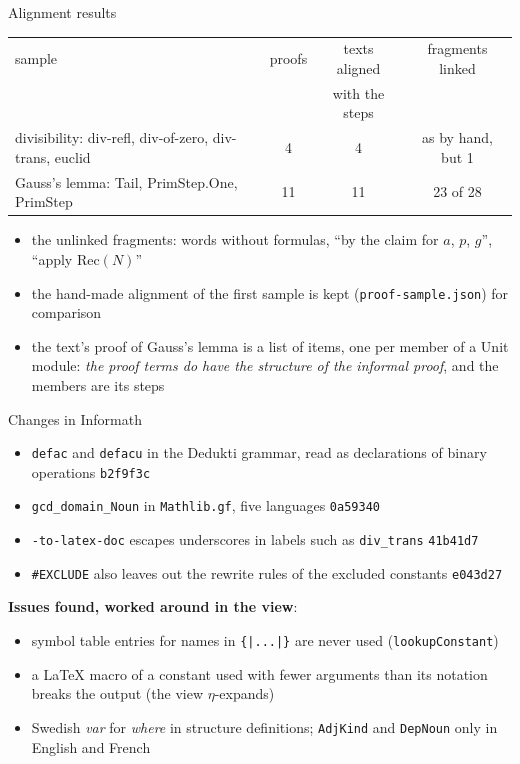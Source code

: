 \documentclass[10pt,aspectratio=169]{beamer}
\newcommand{\commit}[1]{\texttt{\footnotesize #1}}
\newcommand{\file}[1]{\texttt{#1}}
\begin{document}
\begin{frame}{Alignment results}

\centering
\small
\begin{tabular}{p{}ccc}
\toprule
sample & proofs & texts aligned & fragments linked \\
& & with the steps & \\
\midrule
divisibility: div-refl, div-of-zero, div-trans, euclid & 4 & 4 & as by hand, but 1 \\
Gauss's lemma: Tail, PrimStep.One, PrimStep & 11 & 11 & 23 of 28 \\
\bottomrule
\end{tabular}

\vspace{5mm}
\begin{itemize}\small
\item the unlinked fragments: words without formulas, ``by the claim
  for $a$, $p$, $g$'', ``apply $\mathrm{Rec}(N)$''
\item the hand-made alignment of the first sample is kept
  (\file{proof-sample.json}) for comparison
\item the text's proof of Gauss's lemma is a list of items, one per
  member of a Unit module: \emph{the proof terms do have the structure of
  the informal proof}, and the members are its steps
\end{itemize}

\end{frame}

\begin{frame}{Changes in Informath}

\small
\begin{itemize}
\item \texttt{defac} and \texttt{defacu} in the Dedukti grammar, read as
  declarations of binary operations \hfill\commit{b2f9f3c}
\item \texttt{gcd\_domain\_Noun} in \file{Mathlib.gf}, five languages
  \hfill\commit{0a59340}
\item \texttt{-to-latex-doc} escapes underscores in labels such as
  \texttt{div\_trans} \hfill\commit{41b41d7}
\item \texttt{\#EXCLUDE} also leaves out the rewrite rules of the excluded
  constants \hfill\commit{e043d27}
\end{itemize}

\textbf{Issues found, worked around in the view}:
\begin{itemize}
\item symbol table entries for names in \texttt{\{|...|\}} are never used
  (\texttt{lookupConstant})
\item a LaTeX macro of a constant used with fewer arguments than its
  notation breaks the output (the view $\eta$-expands)
\item Swedish \emph{var} for \emph{where} in structure definitions;
  \texttt{AdjKind} and \texttt{DepNoun} only in English and French
\end{itemize}

\end{frame}
\end{document}
